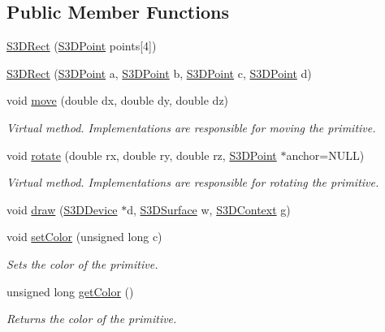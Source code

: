 \subsection*{Public Member Functions}
\begin{DoxyCompactItemize}
\item 
\hyperlink{class_s3_d_rect_a30160c448c675829ced3c254a01ccb6e}{S3DRect} (\hyperlink{class_s3_d_point}{S3DPoint} points\mbox{[}4\mbox{]})
\item 
\hyperlink{class_s3_d_rect_adfec4ab2501bd4cfef0f5fd82d769942}{S3DRect} (\hyperlink{class_s3_d_point}{S3DPoint} a, \hyperlink{class_s3_d_point}{S3DPoint} b, \hyperlink{class_s3_d_point}{S3DPoint} c, \hyperlink{class_s3_d_point}{S3DPoint} d)
\item 
void \hyperlink{class_s3_d_rect_a97fcf9a2380d07c59bc12db8bd5949bc}{move} (double dx, double dy, double dz)
\begin{DoxyCompactList}\small\item\em Virtual method. Implementations are responsible for moving the primitive. \item\end{DoxyCompactList}\item 
void \hyperlink{class_s3_d_rect_a1d3b8406b588abf19cff5f8a6d6de2e2}{rotate} (double rx, double ry, double rz, \hyperlink{class_s3_d_point}{S3DPoint} $\ast$anchor=NULL)
\begin{DoxyCompactList}\small\item\em Virtual method. Implementations are responsible for rotating the primitive. \item\end{DoxyCompactList}\item 
void \hyperlink{class_s3_d_rect_adfa6596cc2a62c83709f0f3a040333c1}{draw} (\hyperlink{types_8h_a25c0773a29204332721bde1b164d0b84}{S3DDevice} $\ast$d, \hyperlink{types_8h_a4afc89c514af26434688c7e8b382ba5e}{S3DSurface} w, \hyperlink{types_8h_a46f30693e0040340e595d8228cc31779}{S3DContext} g)
\item 
void \hyperlink{class_s3_d_rect_af1a976fbe476e7096b2ceded7ab1659c}{setColor} (unsigned long c)
\begin{DoxyCompactList}\small\item\em Sets the color of the primitive. \item\end{DoxyCompactList}\item 
unsigned long \hyperlink{class_s3_d_rect_adbf17caac29e632afb9f380e3821a256}{getColor} ()
\begin{DoxyCompactList}\small\item\em Returns the color of the primitive. \item\end{DoxyCompactList}\item 

\end{DoxyCompactItemize}
